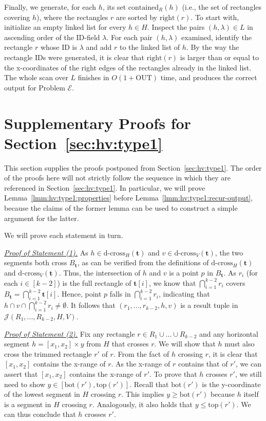 \documentclass[acmsmall,review,anonymous]{acmart}
\def\vgap{\vspace{1mm}}
\def\extraspacing{\vspace{2mm} \noindent}
\def\J{\mathcal{J}}
\def\xright{\mathrm{right}}
\def\ybot{\mathrm{bot}}
\def\ytop{\mathrm{top}}
\def\dcross{\mathrm{d\text{-}cross}}
\def\contained{\mathrm{contained}}
\def\out{\mathrm{OUT}}
\begin{document}
{{{\vgap

Finally, we generate, for each $h$, its set $\contained_R(h)$ (i.e., the set of rectangles covering $h$), where the rectangles $r$ are sorted by $\xright(r)$. To start with, initialize an empty linked list for every $h \in H$. Inspect the pairs $(h, \lambda) \in L$ in ascending order of the ID-field $\lambda$. For each pair $(h, \lambda)$ examined, identify the rectangle $r$ whose ID is $\lambda$ and add $r$ to the linked list of $h$. By the way the rectangle IDs were generated, it is clear that $\xright(r)$ is larger than or equal to the x-coordinates of the right edges of the rectangles already in the linked list. The whole scan over $L$ finishes in $O(1 + \out)$ time, and produces the correct output for Problem $\mathscr{E}$.


\section{Supplementary Proofs for Section~\ref{sec:hv:type1}} \label{app:hv:type1}

This section supplies the proofs postponed from Section~\ref{sec:hv:type1}. The order of the proofs here will not strictly follow the sequence in which they are referenced in Section~\ref{sec:hv:type1}. In particular, we will prove Lemma~\ref{lmm:hv:type1:properties} before Lemma~\ref{lmm:hv:type1:recur-output}, because the claims of the former lemma can be used to construct a simple argument for the latter.

\extraspacing {\bf Proof of Lemma~\ref{lmm:hv:type1:properties}.} We will prove each statement in turn.

\extraspacing \underline{\em Proof of Statement (1).} As $h \in \dcross_H(\bm{t})$ and $v \in \dcross_V(\bm{t})$, the two segments both cross $B_\bm{t}$, as can be verified from the definitions of $\dcross_H(\bm{t})$ and $\dcross_V(\bm{t})$. Thus, the intersection of $h$ and $v$ is a point $p$ in $B_\bm{t}$. As $r_i$ (for each $i \in [k-2]$) is the full rectangle of $\bm{t}[i]$, we know that $\bigcap_{i=1}^{k-2} r_i$ covers $B_\bm{t} = \bigcap_{i=1}^{k-2} \bm{t}[i]$. Hence, point $p$ falls in $\bigcap_{i=1}^{k-2} r_i$, indicating that $h\cap v \cap \bigcap_{i = 1}^{k-2}r_i \neq \emptyset$. It follows that $(r_1,...,r_{k-2},h,v)$ is a result tuple in $\J(R_1,...,R_{k-2},H,V)$.

\extraspacing \underline{\em Proof of Statement (2).} Fix any rectangle $r \in R_1 \cup ... \cup R_{k-2}$ and any horizontal segment $h = [x_1, x_2] \times y$ from $H$ that crosses $r$. We will show that $h$ must also cross the trimmed rectangle $r'$ of $r$. From the fact of $h$ crossing $r$, it is clear that $[x_1, x_2]$ contains the x-range of $r$. As the x-range of $r$ contains that of $r'$, we can assert that $[x_1, x_2]$ contains the x-range of $r'$. To prove that $h$ crosses $r'$, we still need to show $y \in [\ybot(r'), \ytop(r')]$. Recall that $\ybot(r')$ is the y-coordinate of the lowest segment in $H$ crossing $r$. This implies $y \ge \ybot(r')$ because $h$ itself is a segment in $H$ crossing $r$. Analogously, it also holds that $y \le \ytop(r')$. We can thus conclude that $h$ crosses $r'$.

}}}
\end{document}
